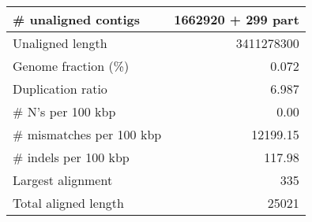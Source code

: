 \documentclass[12pt,a4paper]{article}
\begin{document}
\begin{table}[ht]
\begin{center}
\begin{tabular}{|l*{1}{|r}|}
\# unaligned contigs & 1662920 + 299 part \\ \hline
Unaligned length & 3411278300 \\ \hline
Genome fraction (\%) & 0.072 \\ \hline
Duplication ratio & 6.987 \\ \hline
\# N's per 100 kbp & 0.00 \\ \hline
\# mismatches per 100 kbp & 12199.15 \\ \hline
\# indels per 100 kbp & 117.98 \\ \hline
Largest alignment & 335 \\ \hline
Total aligned length & 25021 \\ \hline
\end{tabular}
\end{center}
\end{table}
\end{document}
